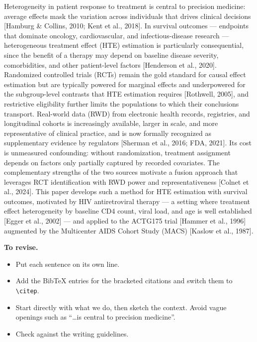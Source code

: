 Heterogeneity in patient response to treatment is central to precision medicine: average effects mask the variation across individuals that drives clinical decisions [Hamburg \& Collins, 2010; Kent et al., 2018].
In survival outcomes --- endpoints that dominate oncology, cardiovascular, and infectious-disease research --- heterogeneous treatment effect (HTE) estimation is particularly consequential, since the benefit of a therapy may depend on baseline disease severity, comorbidities, and other patient-level factors [Henderson et al., 2020].
Randomized controlled trials (RCTs) remain the gold standard for causal effect estimation but are typically powered for marginal effects and underpowered for the subgroup-level contrasts that HTE estimation requires [Rothwell, 2005], and restrictive eligibility further limits the populations to which their conclusions transport.
Real-world data (RWD) from electronic health records, registries, and longitudinal cohorts is increasingly available, larger in scale, and more representative of clinical practice, and is now formally recognized as supplementary evidence by regulators [Sherman et al., 2016; FDA, 2021].
Its cost is unmeasured confounding: without randomization, treatment assignment depends on factors only partially captured by recorded covariates.
The complementary strengths of the two sources motivate a fusion approach that leverages RCT identification with RWD power and representativeness [Colnet et al., 2024].
This paper develops such a method for HTE estimation with survival outcomes, motivated by HIV antiretroviral therapy --- a setting where treatment effect heterogeneity by baseline CD4 count, viral load, and age is well established [Egger et al., 2002] --- and applied to the ACTG175 trial [Hammer et al., 1996] augmented by the Multicenter AIDS Cohort Study (MACS) [Kaslow et al., 1987].

\textbf{To revise.}
\begin{itemize}
  \item Put each sentence on its own line.
  \item Add the BibTeX entries for the bracketed citations and switch them to \texttt{\textbackslash citep}.
  \item Start directly with what we do, then sketch the context.
        Avoid vague openings such as ``\dots is central to precision medicine''.
  \item Check against the writing guidelines.
\end{itemize}




